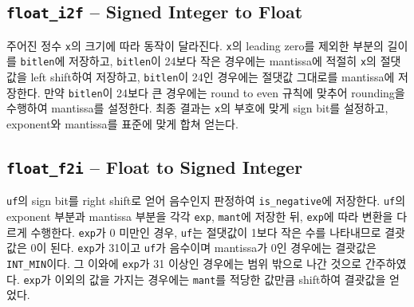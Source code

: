 \documentclass{scrartcl}
\begin{document}
\subsection{\texttt{float\_i2f} -- Signed Integer to Float}
주어진 정수 \texttt{x}의 크기에 따라 동작이 달라진다. \texttt{x}의 leading
zero를 제외한 부분의 길이를 \texttt{bitlen}에 저장하고, \texttt{bitlen}이
24보다 작은 경우에는 mantissa에 적절히 \texttt{x}의 절댓값을 left shift하여
저장하고, \texttt{bitlen}이 24인 경우에는 절댓값 그대로를 mantissa에 저장한다.
만약 \texttt{bitlen}이 24보다 큰 경우에는 round to even 규칙에 맞추어
rounding을 수행하여 mantissa를 설정한다. 최종 결과는 \texttt{x}의 부호에 맞게
sign bit를 설정하고, exponent와 mantissa를 표준에 맞게 합쳐 얻는다.

\subsection{\texttt{float\_f2i} -- Float to Signed Integer}
\texttt{uf}의 sign bit를 right shift로 얻어 음수인지 판정하여
\texttt{is\_negative}에 저장한다. \texttt{uf}의 exponent 부분과 mantissa 부분을
각각 \texttt{exp}, \texttt{mant}에 저장한 뒤, \texttt{exp}에 따라 변환을 다르게
수행한다. \texttt{exp}가 0 미만인 경우, \texttt{uf}는 절댓값이 1보다 작은 수를
나타내므로 결괏값은 0이 된다. \texttt{exp}가 31이고 \texttt{uf}가 음수이며
mantissa가 0인 경우에는 결괏값은 \texttt{INT\_MIN}이다. 그 이와에
\texttt{exp}가 31 이상인 경우에는 범위 밖으로 나간 것으로 간주하였다.
\texttt{exp}가 이외의 값을 가지는 경우에는 \texttt{mant}를 적당한 값만큼
shift하여 결괏값을 얻었다.
\end{document}
